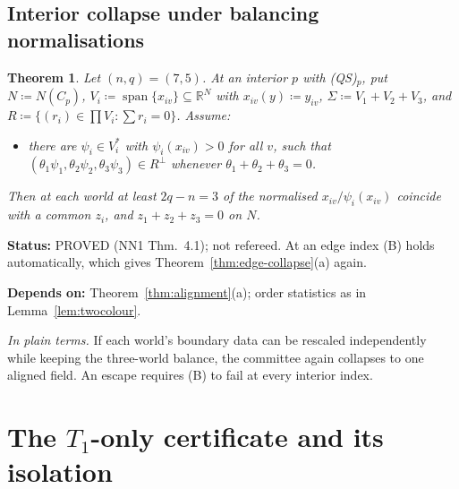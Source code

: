 \documentclass[11pt]{article}
\newtheorem{theorem}{Theorem}[section]
\theoremstyle{definition}
\theoremstyle{remark}
\newcommand{\R}{\mathbb R}
\newcommand{\spn}{\operatorname{span}}
\newcommand{\src}[1]{\textsf{#1}}
\newcommand{\status}[1]{\par\smallskip\noindent\textbf{Status:} #1\par}
\newcommand{\deps}[1]{\noindent\textbf{Depends on:} #1\par}
\newcommand{\inwords}[1]{\noindent\textit{In plain terms.} #1\par\smallskip}
\newcommand{\QS}{\textup{(QS)}}
\begin{document}
\subsection{Interior collapse under balancing normalisations}
\begin{theorem}\label{thm:B-collapse}
Let $(n,q)=(7,5)$. At an interior $p$ with \QS$_p$, put $N\coloneqq N(C_p)$, $V_i\coloneqq\spn\{x_{iv}\}\subseteq\R^N$ with $x_{iv}(y)\coloneqq y_{iv}$, $\Sigma\coloneqq V_1+V_2+V_3$, and $R\coloneqq\{(r_i)\in\prod V_i:\sum r_i=0\}$. Assume:
\begin{itemize}[leftmargin=*]
\item[(B)] there are $\psi_i\in V_i^*$ with $\psi_i(x_{iv})>0$ for all $v$, such that $(\theta_1\psi_1,\theta_2\psi_2,\theta_3\psi_3)\in R^\perp$ whenever $\theta_1+\theta_2+\theta_3=0$.
\end{itemize}
Then at each world at least $2q-n=3$ of the normalised $x_{iv}/\psi_i(x_{iv})$ coincide with a common $z_i$, and $z_1+z_2+z_3=0$ on $N$.
\end{theorem}
\status{PROVED (\src{NN1} Thm.~4.1); not refereed. At an edge index (B) holds automatically, which gives Theorem~\ref{thm:edge-collapse}(a) again.}
\deps{Theorem~\ref{thm:alignment}(a); order statistics as in Lemma~\ref{lem:twocolour}.}
\inwords{If each world's boundary data can be rescaled independently while keeping the three-world balance, the committee again collapses to one aligned field. An escape requires (B) to fail at every interior index.}

\section{The \texorpdfstring{$T_1$}{T1}-only certificate and its isolation}\label{sec:t1only}
\end{document}
